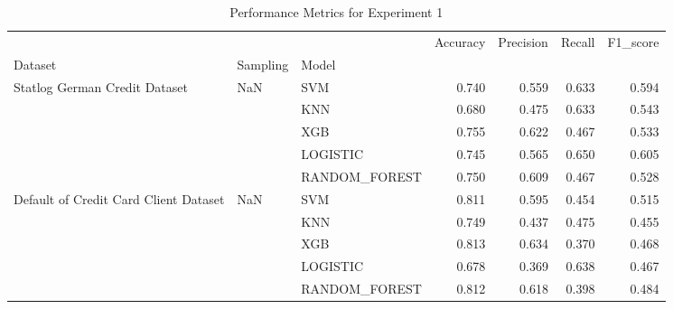 \begin{table}
\caption{Performance Metrics for Experiment 1}
\label{tab:experiment_1_results}
\begin{tabular}{lllrrrr}
\toprule
 &  &  & Accuracy & Precision & Recall & F1\_score \\
Dataset & Sampling & Model &  &  &  &  \\
\midrule
\multirow[t]{5}{*}{Statlog German Credit Dataset} & \multirow[t]{5}{*}{NaN} & SVM & 0.740 & 0.559 & 0.633 & 0.594 \\
 &  & KNN & 0.680 & 0.475 & 0.633 & 0.543 \\
 &  & XGB & 0.755 & 0.622 & 0.467 & 0.533 \\
 &  & LOGISTIC & 0.745 & 0.565 & 0.650 & 0.605 \\
 &  & RANDOM\_FOREST & 0.750 & 0.609 & 0.467 & 0.528 \\
\cline{1-7} \cline{2-7}
\multirow[t]{5}{*}{Default of Credit Card Client Dataset} & \multirow[t]{5}{*}{NaN} & SVM & 0.811 & 0.595 & 0.454 & 0.515 \\
 &  & KNN & 0.749 & 0.437 & 0.475 & 0.455 \\
 &  & XGB & 0.813 & 0.634 & 0.370 & 0.468 \\
 &  & LOGISTIC & 0.678 & 0.369 & 0.638 & 0.467 \\
 &  & RANDOM\_FOREST & 0.812 & 0.618 & 0.398 & 0.484 \\
\cline{1-7} \cline{2-7}
\bottomrule
\end{tabular}
\end{table}
